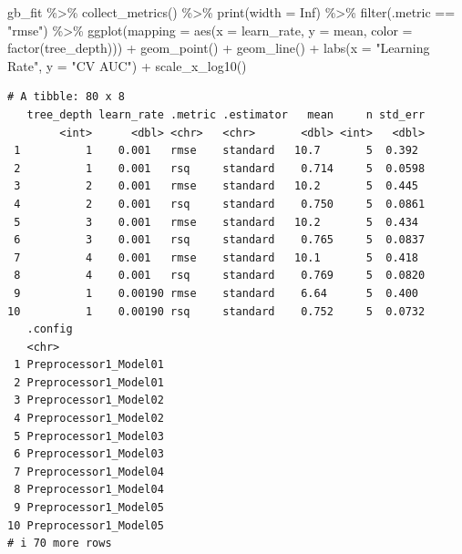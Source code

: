\documentclass[
]{article}
\newenvironment{Shaded}{\begin{snugshade}}{\end{snugshade}}
\newcommand{\AttributeTok}[1]{\textcolor[rgb]{0.40,0.45,0.13}{#1}}
\newcommand{\ConstantTok}[1]{\textcolor[rgb]{0.56,0.35,0.01}{#1}}
\newcommand{\FunctionTok}[1]{\textcolor[rgb]{0.28,0.35,0.67}{#1}}
\newcommand{\NormalTok}[1]{\textcolor[rgb]{0.00,0.23,0.31}{#1}}
\newcommand{\SpecialCharTok}[1]{\textcolor[rgb]{0.37,0.37,0.37}{#1}}
\newcommand{\StringTok}[1]{\textcolor[rgb]{0.13,0.47,0.30}{#1}}
\begin{document}
\begin{Shaded}
\begin{Highlighting}[]
\NormalTok{gb\_fit }\SpecialCharTok{\%\textgreater{}\%}
  \FunctionTok{collect\_metrics}\NormalTok{() }\SpecialCharTok{\%\textgreater{}\%}
  \FunctionTok{print}\NormalTok{(}\AttributeTok{width =} \ConstantTok{Inf}\NormalTok{) }\SpecialCharTok{\%\textgreater{}\%}
  \FunctionTok{filter}\NormalTok{(.metric }\SpecialCharTok{==} \StringTok{"rmse"}\NormalTok{) }\SpecialCharTok{\%\textgreater{}\%}
  \FunctionTok{ggplot}\NormalTok{(}\AttributeTok{mapping =} \FunctionTok{aes}\NormalTok{(}\AttributeTok{x =}\NormalTok{ learn\_rate, }\AttributeTok{y =}\NormalTok{ mean, }\AttributeTok{color =} \FunctionTok{factor}\NormalTok{(tree\_depth))) }\SpecialCharTok{+}
  \FunctionTok{geom\_point}\NormalTok{() }\SpecialCharTok{+}
  \FunctionTok{geom\_line}\NormalTok{() }\SpecialCharTok{+}
  \FunctionTok{labs}\NormalTok{(}\AttributeTok{x =} \StringTok{"Learning Rate"}\NormalTok{, }\AttributeTok{y =} \StringTok{"CV AUC"}\NormalTok{) }\SpecialCharTok{+}
  \FunctionTok{scale\_x\_log10}\NormalTok{()}
\end{Highlighting}
\end{Shaded}

\begin{verbatim}
# A tibble: 80 x 8
   tree_depth learn_rate .metric .estimator   mean     n std_err
        <int>      <dbl> <chr>   <chr>       <dbl> <int>   <dbl>
 1          1    0.001   rmse    standard   10.7       5  0.392 
 2          1    0.001   rsq     standard    0.714     5  0.0598
 3          2    0.001   rmse    standard   10.2       5  0.445 
 4          2    0.001   rsq     standard    0.750     5  0.0861
 5          3    0.001   rmse    standard   10.2       5  0.434 
 6          3    0.001   rsq     standard    0.765     5  0.0837
 7          4    0.001   rmse    standard   10.1       5  0.418 
 8          4    0.001   rsq     standard    0.769     5  0.0820
 9          1    0.00190 rmse    standard    6.64      5  0.400 
10          1    0.00190 rsq     standard    0.752     5  0.0732
   .config              
   <chr>                
 1 Preprocessor1_Model01
 2 Preprocessor1_Model01
 3 Preprocessor1_Model02
 4 Preprocessor1_Model02
 5 Preprocessor1_Model03
 6 Preprocessor1_Model03
 7 Preprocessor1_Model04
 8 Preprocessor1_Model04
 9 Preprocessor1_Model05
10 Preprocessor1_Model05
# i 70 more rows
\end{verbatim}
\end{document}

